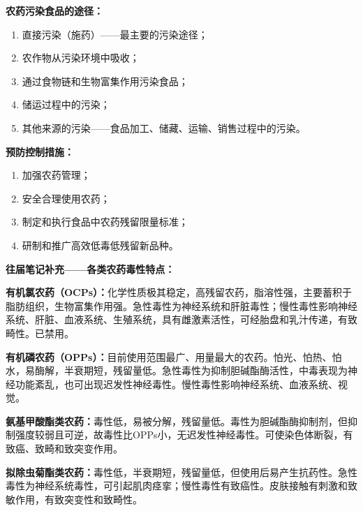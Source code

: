 \begin{defbox}
\textbf{农药污染食品的途径：}
\begin{enumerate}[leftmargin=*]
    \item 直接污染（施药）——最主要的污染途径；
    \item 农作物从污染环境中吸收；
    \item 通过食物链和生物富集作用污染食品；
    \item 储运过程中的污染；
    \item 其他来源的污染——食品加工、储藏、运输、销售过程中的污染。
\end{enumerate}

\textbf{预防控制措施：}
\begin{enumerate}[leftmargin=*]
    \item 加强农药管理；
    \item 安全合理使用农药；
    \item 制定和执行食品中农药残留限量标准；
    \item 研制和推广高效低毒低残留新品种。
\end{enumerate}
\end{defbox}

\begin{tipbox}
\textbf{往届笔记补充——各类农药毒性特点：}

\textbf{有机氯农药（OCPs）：}化学性质极其稳定，高残留农药，脂溶性强，主要蓄积于脂肪组织，生物富集作用强。急性毒性为神经系统和肝脏毒性；慢性毒性影响神经系统、肝脏、血液系统、生殖系统，具有雌激素活性，可经胎盘和乳汁传递，有致畸性。已禁用。

\textbf{有机磷农药（OPPs）：}目前使用范围最广、用量最大的农药。怕光、怕热、怕水，易酶解，半衰期短，残留量低。急性毒性为抑制胆碱酯酶活性，中毒表现为神经功能紊乱，也可出现迟发性神经毒性。慢性毒性影响神经系统、血液系统、视觉。

\textbf{氨基甲酸酯类农药：}毒性低，易被分解，残留量低。毒性为胆碱酯酶抑制剂，但抑制强度较弱且可逆，故毒性比OPPs小，无迟发性神经毒性。可使染色体断裂，有致癌、致畸和致突变作用。

\textbf{拟除虫菊酯类农药：}毒性低，半衰期短，残留量低，但使用后易产生抗药性。急性毒性为神经系统毒性，可引起肌肉痉挛；慢性毒性有致癌性。皮肤接触有刺激和致敏作用，有致突变性和致畸性。
\end{tipbox}

